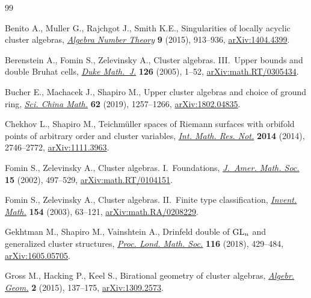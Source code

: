 \documentclass[pdftex]{sigma}
\numberwithin{equation}{section}
\begin{document}
\begin{thebibliography}{99}
\footnotesize\itemsep=0pt

Benito A., Muller G., Rajchgot J., Smith K.E., Singularities of locally acyclic
 cluster algebras, \href{https://doi.org/10.2140/ant.2015.9.913}{\textit{Algebra Number Theory}} \textbf{9} (2015), 913--936,
 \href{https://arxiv.org/abs/1404.4399}{arXiv:1404.4399}.

Berenstein A., Fomin S., Zelevinsky A., Cluster algebras. {III}.~{U}pper bounds
 and double {B}ruhat cells, \href{https://doi.org/10.1215/S0012-7094-04-12611-9}{\textit{Duke Math.~J.}} \textbf{126} (2005), 1--52,
 \href{https://arxiv.org/abs/math.RT/0305434}{arXiv:math.RT/0305434}.

Bucher E., Machacek J., Shapiro M., Upper cluster algebras and choice of ground
 ring, \href{https://doi.org/10.1007/s11425-018-9486-6}{\textit{Sci. China Math.}} \textbf{62} (2019), 1257--1266,
 \href{https://arxiv.org/abs/1802.04835}{arXiv:1802.04835}.

Chekhov L., Shapiro M., Teichm\"uller spaces of {R}iemann surfaces with
 orbifold points of arbitrary order and cluster variables, \href{https://doi.org/10.1093/imrn/rnt016}{\textit{Int. Math.
 Res. Not.}} \textbf{2014} (2014), 2746--2772, \href{https://arxiv.org/abs/1111.3963}{arXiv:1111.3963}.

Fomin S., Zelevinsky A., Cluster algebras. {I}.~{F}oundations, \href{https://doi.org/10.1090/S0894-0347-01-00385-X}{\textit{J.~Amer.
 Math. Soc.}} \textbf{15} (2002), 497--529, \href{https://arxiv.org/abs/math.RT/0104151}{arXiv:math.RT/0104151}.

Fomin S., Zelevinsky A., Cluster algebras. {II}.~{F}inite type classification,
 \href{https://doi.org/10.1007/s00222-003-0302-y}{\textit{Invent. Math.}} \textbf{154} (2003), 63--121,
 \href{https://arxiv.org/abs/math.RA/0208229}{arXiv:math.RA/0208229}.

Gekhtman M., Shapiro M., Vainshtein A., Drinfeld double of {${\rm GL}_n$} and
 generalized cluster structures, \href{https://doi.org/10.1112/plms.12086}{\textit{Proc. Lond. Math. Soc.}} \textbf{116}
 (2018), 429--484, \href{https://arxiv.org/abs/1605.05705}{arXiv:1605.05705}.

Gross M., Hacking P., Keel S., Birational geometry of cluster algebras,
 \href{https://doi.org/10.14231/AG-2015-007}{\textit{Algebr. Geom.}} \textbf{2} (2015), 137--175, \href{https://arxiv.org/abs/1309.2573}{arXiv:1309.2573}.


\end{thebibliography}
\end{document}
